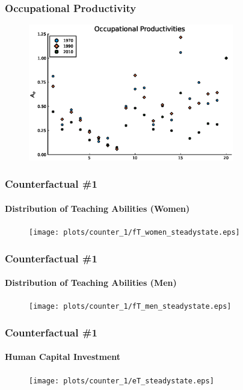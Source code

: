 \documentclass[11pt]{beamer}
\begin{document}
\begin{frame}
\frametitle{Occupational Productivity}
\begin{figure}
\begin{center}
\includegraphics[width=0.8\textwidth]{plots/A_men_70_10.eps}
\label{ }
\end{center}
\end{figure}
\hyperlink{occupations}{}
\hyperlink{barriers3}{}
\end{frame}

\appendix

\begin{frame}
\frametitle{Counterfactual \#1}
\framesubtitle{Distribution of Teaching Abilities (Women)}
\begin{figure}
\begin{center}
\texttt{[image: plots/counter\_1/fT\_women\_steadystate.eps]}
\label{ }
\end{center}
\end{figure}
\end{frame}

\begin{frame}
\frametitle{Counterfactual \#1}
\framesubtitle{Distribution of Teaching Abilities (Men)}
\begin{figure}
\begin{center}
\texttt{[image: plots/counter\_1/fT\_men\_steadystate.eps]}
\label{ }
\end{center}
\end{figure}
\end{frame}

\begin{frame}
\frametitle{Counterfactual \#1}
\framesubtitle{Human Capital Investment}
\begin{figure}
\begin{center}
\texttt{[image: plots/counter\_1/eT\_steadystate.eps]}
\label{ }
\end{center}
\end{figure}
\end{frame}
\end{document}
